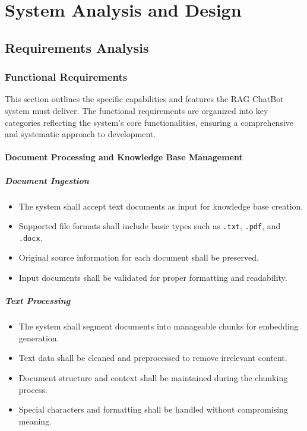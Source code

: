 \documentclass[12pt,a4paper]{report}
\begin{document}
\chapter{System Analysis and Design}
\section{Requirements Analysis}
\subsection{Functional Requirements}

This section outlines the specific capabilities and features the RAG ChatBot system must deliver. The functional requirements are organized into key categories reflecting the system's core functionalities, ensuring a comprehensive and systematic approach to development.

\subsubsection{Document Processing and Knowledge Base Management}
\paragraph{Document Ingestion}
\begin{itemize}
    \item The system shall accept text documents as input for knowledge base creation.
    \item Supported file formats shall include basic types such as \texttt{.txt}, \texttt{.pdf}, and \texttt{.docx}.
    \item Original source information for each document shall be preserved.
    \item Input documents shall be validated for proper formatting and readability.
\end{itemize}

\paragraph{Text Processing}
\begin{itemize}
    \item The system shall segment documents into manageable chunks for embedding generation.
    \item Text data shall be cleaned and preprocessed to remove irrelevant content.
    \item Document structure and context shall be maintained during the chunking process.
    \item Special characters and formatting shall be handled without compromising meaning.
\end{itemize}
\end{document}
